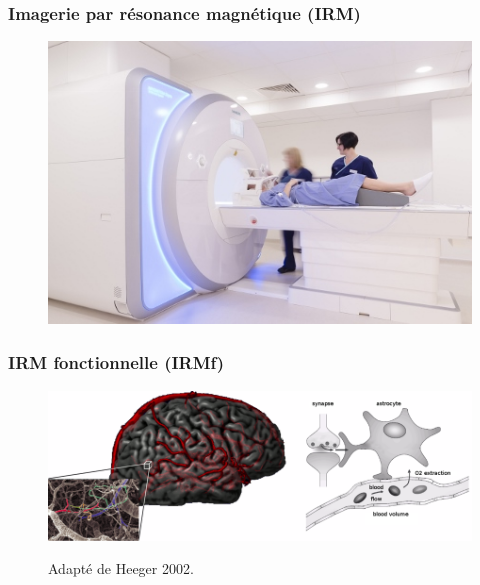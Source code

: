 \documentclass{beamer}
\begin{document}

\begin{frame}
\frametitle{Imagerie par résonance magnétique (IRM)}
\begin{figure}
\begin{center}
\includegraphics[width=0.7\linewidth]{../figures/scanner.jpg}
\end{center}
\end{figure}
\end{frame}


\begin{frame}
\frametitle{IRM fonctionnelle (IRMf)}
\begin{figure}[H]
\begin{center}
\includegraphics[width=\linewidth]{../figures/bold.png}
\end{center}
\tiny{Adapté de Heeger 2002.}

\end{figure}
\end{frame}
\end{document}
